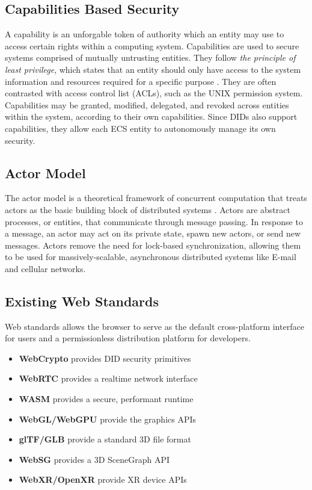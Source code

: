 \documentclass[twocolumn, 10pt]{article}
\begin{document}
\subsection{Capabilities Based Security}
A capability is an unforgable token of authority which an entity may use to access certain rights within a computing system. Capabilities are used to secure systems comprised of mutually untrusting entities. They follow \textit{the principle of least privilege}, which states that an entity should only have access to the system information and resources required for a specific purpose \cite{saltzer1975protection}. They are often contrasted with access control list (ACLs), such as the UNIX permission system. Capabilities may be granted, modified, delegated, and revoked across entities within the system, according to their own capabilities. Since DIDs also support capabilities, they allow each ECS entity to autonomously manage its own security.

\subsection{Actor Model}
The actor model is a theoretical framework of concurrent computation that treats actors as the basic building block of distributed systems \cite{hewitt1973universal}. Actors are abstract processes, or entities, that communicate through message passing. In response to a message, an actor may act on its private state, spawn new actors, or send new messages. Actors remove the need for lock-based synchronization, allowing them to be used for massively-scalable, asynchronous distributed systems like E-mail and cellular networks.

\subsection{Existing Web Standards}
Web standards allows the browser to serve as the default cross-platform interface for users and a permissionless distribution platform for developers.
\begin{itemize}
    \item \textbf{WebCrypto} provides DID security primitives
    \item \textbf{WebRTC} provides a realtime network interface
    \item \textbf{WASM} provides a secure, performant runtime
    \item \textbf{WebGL/WebGPU} provide the graphics APIs
    \item\textbf{glTF/GLB} provide a standard 3D file format
    \item \textbf{WebSG} provides a 3D SceneGraph API
    \item \textbf{WebXR/OpenXR} provide XR device APIs
\end{itemize}
\end{document}
